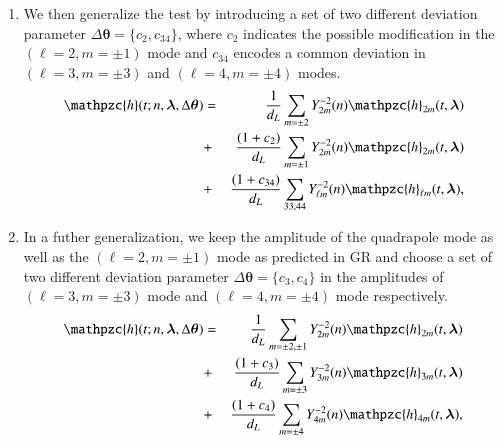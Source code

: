 \documentclass[prd,preprintnumbers,twocolumn,eqsecnum,floatfix,a4paper,nofootinbib,superscriptaddress]{revtex4}
\newcommand{\h}{\mathpzc{h}}
\newcommand{\hlm}{\mathpzc{h}_{\ell m}}
\newcommand{\Ylm}{{Y}^{-2}_{\ell m}}
\newcommand{\blambda}{\bm{\lambda}}
\newcommand{\btheta}{\bm{\theta}}
\begin{document}
\begin{enumerate}
 	\item We then generalize the test by introducing a set of two different deviation parameter $\Delta \btheta=\{c_2, c_{34}\}$, where $c_2$ indicates the possible modification in the  $(\ell = 2, m=\pm1)$ mode and $c_{34}$ encodes a common deviation in $(\ell = 3, m=\pm3)$ and $(\ell = 4, m = \pm4)$ modes.
 	\begin{eqnarray}
 	{\h}(t; n, \blambda, \Delta \btheta) & = & \frac{1}{d_L} \sum_{m = \pm2} Y^{-2}_{2m} (n) {\h}_{2m}(t, \blambda)  \nonumber \\ 
 	& + & \frac{(1+{c_2})}{d_L} \sum_{m = \pm1} Y^{-2}_{2m} (n) {\h}_{2m}(t, \blambda) \nonumber\\
 	& + & \frac{(1+{c_{34}})}{d_L} \sum _{\text{33,44}} \Ylm (n) \hlm(t, \blambda),
 	\label{eq:test_c2_c34}
 	\end{eqnarray}

	
 	\item In a futher generalization, we keep the amplitude of the quadrapole mode as well as the $(\ell = 2, m=\pm1)$ mode as predicted in GR and choose a set of two different deviation parameter $\Delta \btheta=\{c_3, c_{4}\}$ in the amplitudes of  $(\ell = 3, m=\pm3)$ mode and $(\ell = 4, m = \pm4)$ mode respectively.
 	\begin{eqnarray}
 	{\h}(t; n, \blambda, \Delta \btheta) & = & \frac{1}{d_L} \sum_{m = \pm2,\pm1} Y^{-2}_{2m} (n) {\h}_{2m}(t, \blambda)  \nonumber \\ 
 	& + & \frac{(1+{c_3})}{d_L} \sum_{m = \pm3} Y^{-2}_{3m} (n) {\h}_{3m}(t, \blambda) \nonumber\\
 	& + & \frac{(1+{c_{4}})}{d_L} \sum _{m=\pm4} Y^{-2}_{4m} (n) {\h}_{4m}(t, \blambda),
 	\label{eq:test_c3_c4}
 	\end{eqnarray}
 \end{enumerate}
\end{document}
